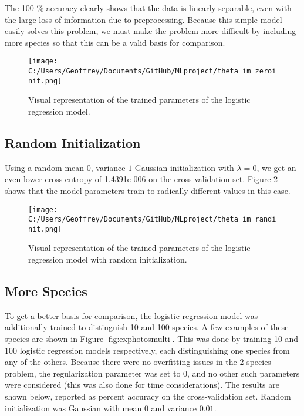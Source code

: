\documentclass[12pt]{article}
\begin{document}
The 100 \% accuracy clearly shows that the data is linearly separable, even with the large loss of information due to preprocessing. Because this simple model easily solves this problem, we must make the problem more difficult by including more species so that this can be a valid basis for comparison.

\begin{figure}
\begin{center} 
 \texttt{[image: C:/Users/Geoffrey/Documents/GitHub/MLproject/theta\_im\_zeroinit.png]}
\end{center}
\caption{\label{fig:thetaZeroinitLogR} Visual representation of the trained parameters of the logistic regression model.}
\end{figure}

\subsection{Random Initialization} Using a random mean $0$, variance $1$ Gaussian initialization with $\lambda = 0$, we get an even lower cross-entropy of 1.4391e-006 on the cross-validation set. Figure \ref{fig:thetaRandinitLogR} shows that the model parameters train to radically different values in this case.

\begin{figure}
\begin{center}
 \texttt{[image: C:/Users/Geoffrey/Documents/GitHub/MLproject/theta\_im\_randinit.png]}
\end{center} 
\caption{\label{fig:thetaRandinitLogR} Visual representation of the trained parameters of the logistic regression model with random initialization.}
\end{figure}

\subsection{More Species} To get a better basis for comparison, the logistic regression model was additionally trained to distinguish 10 and 100 species. A few examples of these species are shown in Figure \ref{fig:exphotosmulti}. This was done by training 10 and 100 logistic regression models respectively, each distinguishing one species from any of the others. Because there were no overfitting issues in the 2 species problem, the regularization parameter was set to $0$, and no other such parameters were considered (this was also done for time considerations). The results are shown below, reported as percent accuracy on the cross-validation set. Random initialization was Gaussian with mean $0$ and variance $0.01$.
\end{document}
